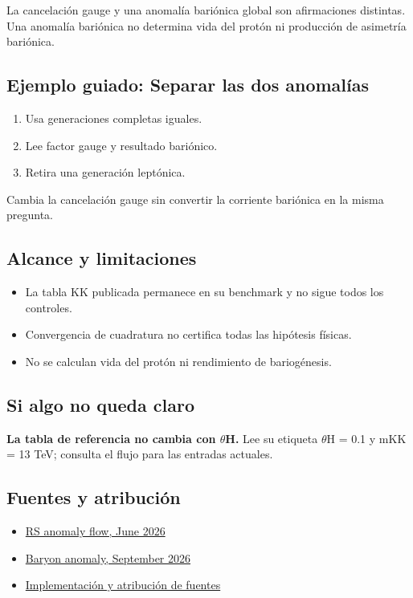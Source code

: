 \documentclass[11pt,a4paper]{article}
\begin{document}
La cancelación gauge y una anomalía bariónica global son afirmaciones distintas. Una anomalía bariónica no determina vida del protón ni producción de asimetría bariónica.
\subsection*{Ejemplo guiado: Separar las dos anomalías}
\begin{enumerate}
\item Usa generaciones completas iguales.
\item Lee factor gauge y resultado bariónico.
\item Retira una generación leptónica.
\end{enumerate}
Cambia la cancelación gauge sin convertir la corriente bariónica en la misma pregunta.
\subsection*{Alcance y limitaciones}
\begin{itemize}
\item La tabla KK publicada permanece en su benchmark y no sigue todos los controles.
\item Convergencia de cuadratura no certifica todas las hipótesis físicas.
\item No se calculan vida del protón ni rendimiento de bariogénesis.
\end{itemize}
\subsection*{Si algo no queda claro}
\textbf{La tabla de referencia no cambia con \ensuremath{\theta}H.} Lee su etiqueta \ensuremath{\theta}H = 0.1 y mKK = 13 TeV; consulta el flujo para las entradas actuales.

\subsection*{Fuentes y atribución}
\begin{itemize}
\item \href{https://arxiv.org/abs/2606.01829}{RS anomaly flow, June 2026}
\item \href{https://arxiv.org/abs/2609.29135}{Baryon anomaly, September 2026}
\item \href{https://github.com/karlesmarin/ghu-lab/blob/main/src/modules/rs_anomaly.mjs}{Implementación y atribución de fuentes}
\end{itemize}
\end{document}
